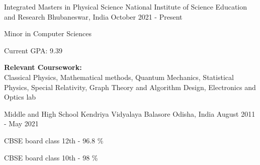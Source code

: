 

\begin{cventries}

  \cventry
    {Integrated Masters in Physical Science} %
    {National Institute of Science Education and Research} %
    {Bhubaneswar, India} %
    {October 2021 - Present} %
    {
      \begin{cvitems} %
        \item {Minor in Computer Sciences}
        \item {Current GPA: 9.39}
        \item{\textbf{Relevant Coursework:} \\Classical Physics, Mathematical methods, Quantum Mechanics, Statistical Physics, Special Relativity, Graph Theory and Algorithm Design, Electronics and Optics lab} 
      \end{cvitems}
    }
    
  \cventry
    {Middle and High School} %
    {Kendriya Vidyalaya Balasore} %
    {Odisha, India} %
    {August 2011 - May 2021} %
    {
      \begin{cvitems} %
        \item CBSE board class 12th - 96.8 \%
        \item CBSE board class 10th - 98 \%
      \end{cvitems}
    }
\end{cventries}
